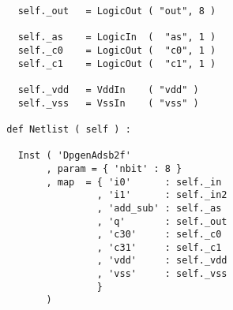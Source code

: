 \begin{itemize}
\begin{verbatim}
    self._out   = LogicOut ( "out", 8 )

    self._as    = LogicIn  (  "as", 1 )
    self._c0    = LogicOut (  "c0", 1 )
    self._c1    = LogicOut (  "c1", 1 )
    
    self._vdd   = VddIn    ( "vdd" )
    self._vss   = VssIn    ( "vss" )
    
  def Netlist ( self ) :
      
    Inst ( 'DpgenAdsb2f'
         , param = { 'nbit' : 8 }
         , map  = { 'i0'      : self._in
                  , 'i1'      : self._in2
                  , 'add_sub' : self._as
                  , 'q'       : self._out
                  , 'c30'     : self._c0
                  , 'c31'     : self._c1
                  , 'vdd'     : self._vdd
                  , 'vss'     : self._vss
                  }
         )
\end{verbatim}
\end{itemize}
